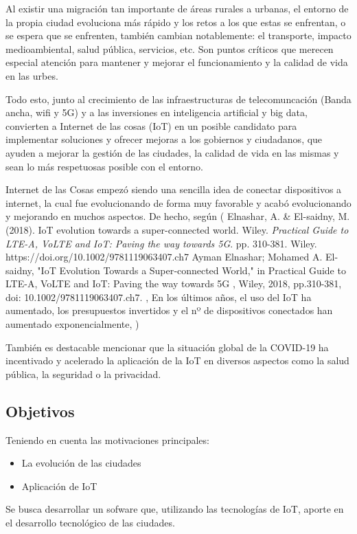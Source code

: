 \documentclass[12pt, a4paper, twoside]{article}
\begin{document}
Al existir una migración tan importante de áreas rurales a urbanas, el entorno de la
propia ciudad evoluciona más rápido y los retos a los que estas se enfrentan, o se espera que se enfrenten,
también cambian notablemente: el transporte, impacto medioambiental, salud pública, servicios, etc. Son puntos
críticos que merecen especial atención para mantener y mejorar el funcionamiento y la calidad de vida en
las urbes.

Todo esto, junto al crecimiento de las infraestructuras de telecomuncación (Banda ancha, wifi y 5G)
y a las inversiones en inteligencia artificial y big data, convierten  a Internet de las cosas (IoT)
 en un posible candidato para implementar soluciones y ofrecer mejoras a los gobiernos y ciudadanos, 
que ayuden a mejorar la gestión de las ciudades, la calidad de vida en las mismas y 
sean lo más respetuosas posible con el entorno.

Internet de las Cosas empezó siendo una sencilla idea de conectar dispositivos a
internet, la cual fue evolucionando de forma muy favorable y acabó evolucionando y 
mejorando en muchos aspectos. De hecho, según (
Elnashar, A. \& El-saidny, M. (2018). IoT evolution towards a super-connected world. Wiley. \textit{Practical Guide to LTE-A, VoLTE and IoT: Paving the way towards 5G}. pp. 310-381. Wiley. https://doi.org/10.1002/9781119063407.ch7
Ayman Elnashar; Mohamed A. El-saidny, "IoT Evolution Towards a Super‐connected World," in Practical Guide to LTE-A, VoLTE and IoT: Paving the way towards 5G , Wiley, 2018, pp.310-381, doi: 10.1002/9781119063407.ch7.
, En los últimos años, el uso del IoT ha aumentado, los presupuestos 
invertidos y el nº de dispositivos conectados han aumentado exponencialmente,
)

También es destacable mencionar que la situación global de la COVID-19 ha incentivado
y acelerado la aplicación de la IoT en diversos aspectos como la salud pública,
la seguridad o la privacidad.

\subsection{Objetivos}
Teniendo en cuenta las motivaciones principales:
\begin{itemize}
  \item La evolución de las ciudades
  \item Aplicación de IoT
\end{itemize}

Se busca desarrollar un sofware que, utilizando las tecnologías de IoT, aporte en el desarrollo 
tecnológico de las ciudades. 
\end{document}
